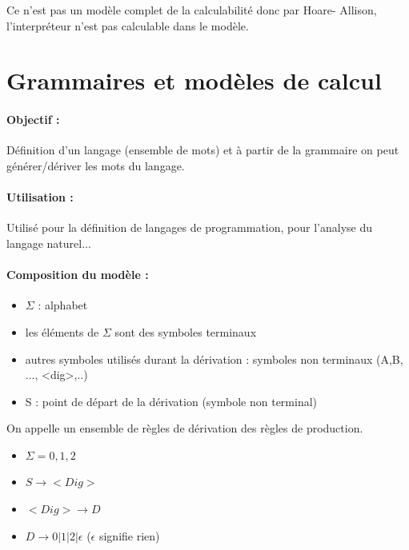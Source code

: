 \begin{myprop}
	Ce n'est pas un modèle complet de la calculabilité donc par Hoare-
	Allison, l'interpréteur n'est pas calculable dans le modèle.
\end{myprop}


\section{Grammaires et modèles de calcul}
\label{sub:grammaires_et_mod_les_de_calcul}

\paragraph{Objectif :}
Définition d'un langage (ensemble de mots) et à partir de la grammaire on peut
générer/dériver les mots du langage.

\paragraph{Utilisation :} Utilisé pour la définition de langages de
programmation, pour l'analyse du langage naturel...

\paragraph{Composition du modèle :}

\begin{itemize}
	\item $\Sigma$ : alphabet
	\item les éléments de $\Sigma$ sont des symboles terminaux
	\item autres symboles utilisés durant la dérivation : symboles non
		terminaux (A,B, ..., <dig>,..)
	\item S : point de départ de la dérivation (symbole non terminal)
\end{itemize}

\begin{mydef}
	On appelle un ensemble de règles de dérivation des règles de production.
\end{mydef}

\begin{myexem}
	\begin{itemize}
		\item $\Sigma ={0,1,2}$
		\item $S \rightarrow <Dig>$
		\item $<Dig> \rightarrow D$
		\item $D \rightarrow 0 | 1 |2 | \epsilon $ ($\epsilon$ signifie rien)
	\end{itemize}
\end{myexem}

